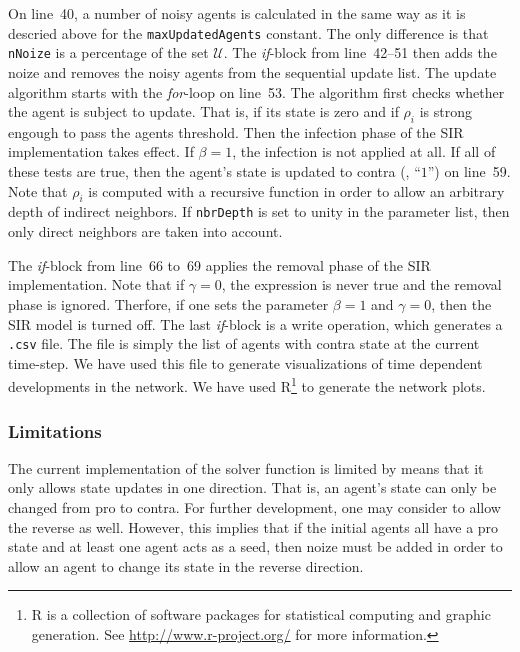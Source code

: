 On line~40, a number of noisy agents is calculated in the same way as it is
descried above for the \texttt{maxUpdatedAgents} constant.  The only difference
is that \texttt{nNoize} is a percentage of the set $\mathcal{U}$.  The
\textsl{if}-block from line~42--51 then adds the noize and removes the noisy
agents from the sequential update list.  The update algorithm starts with the
\textsl{for}-loop on line~53.  The algorithm first checks whether the agent is
subject to update.  That is, if its state is zero and if $\rho_i$ is strong
engough to pass the agents threshold.  Then the infection phase of the SIR
implementation takes effect.  If $\beta = 1$, the infection is not applied at
all.  If all of these tests are true, then the agent's state is updated to
contra (\ie, ``$1$'') on line~59.  Note that $\rho_i$ is computed with a
recursive function in order to allow an arbitrary depth of indirect neighbors.
If \texttt{nbrDepth} is set to unity in the parameter list, then only direct
neighbors are taken into account.

The \textsl{if}-block from line~66 to~69 applies the removal phase of the SIR
implementation.  Note that if $\gamma = 0$, the expression is never true and
the removal phase is ignored.  Therfore, if one sets the parameter $\beta = 1$
and $\gamma = 0$, then the SIR model is turned off.  The last \textsl{if}-block
is a write operation, which generates a \texttt{.csv} file.  The file is simply
the list of agents with contra state at the current time-step.  We have used
this file to generate visualizations of time dependent developments in the
network.  We have used R\footnote{R is a collection of software packages for
  statistical computing and graphic generation.  See
  \url{http://www.r-project.org/} for more information.} to generate the
network plots.

\subsubsection{Limitations}
\label{sec:solverLimitations}

The current implementation of the solver function is limited by means that it
only allows state updates in one direction.  That is, an agent's state can only
be changed from pro to contra.  For further development, one may consider to
allow the reverse as well.  However, this implies that if the initial agents
all have a pro state and at least one agent acts as a seed, then noize must be
added in order to allow an agent to change its state in the reverse direction.

